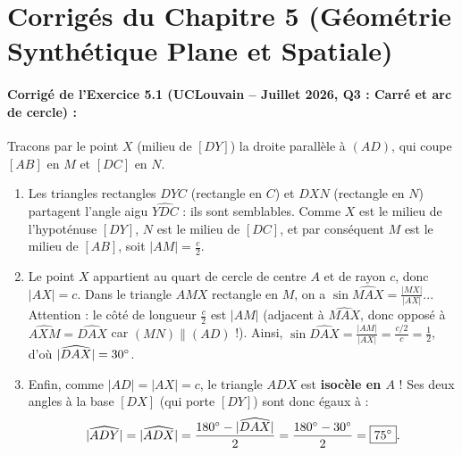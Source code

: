 \section{Corrigés du Chapitre 5 (Géométrie Synthétique Plane et Spatiale)}

\paragraph{Corrigé de l'Exercice 5.1 (UCLouvain -- Juillet 2026, Q3 : Carré et arc de cercle) :}
Tracons par le point $X$ (milieu de $[DY]$) la droite parallèle à $(AD)$, qui coupe $[AB]$ en $M$ et $[DC]$ en $N$.
\begin{enumerate}
    \item Les triangles rectangles $DYC$ (rectangle en $C$) et $DXN$ (rectangle en $N$) partagent l'angle aigu $\widehat{YDC}$ : ils sont semblables. Comme $X$ est le milieu de l'hypoténuse $[DY]$, $N$ est le milieu de $[DC]$, et par conséquent $M$ est le milieu de $[AB]$, soit $|AM| = \frac{c}{2}$.
    \item Le point $X$ appartient au quart de cercle de centre $A$ et de rayon $c$, donc $|AX| = c$. Dans le triangle $AMX$ rectangle en $M$, on a $\sin\widehat{MAX} = \frac{|MX|}{|AX|}$... Attention : le côté de longueur $\frac{c}{2}$ est $|AM|$ (adjacent à $\widehat{MAX}$, donc opposé à $\widehat{AXM} = \widehat{DAX}$ car $(MN) \parallel (AD)$ !). Ainsi, $\sin\widehat{DAX} = \frac{|AM|}{|AX|} = \frac{c/2}{c} = \frac{1}{2}$, d'où $|\widehat{DAX}| = 30\degree$.
    \item Enfin, comme $|AD| = |AX| = c$, le triangle $ADX$ est \textbf{isocèle en $A$} ! Ses deux angles à la base $[DX]$ (qui porte $[DY]$) sont donc égaux à :
    \[
        |\widehat{ADY}| = |\widehat{ADX}| = \frac{180\degree - |\widehat{DAX}|}{2} = \frac{180\degree - 30\degree}{2} = \boxed{75\degree}.
    \]
\end{enumerate}

